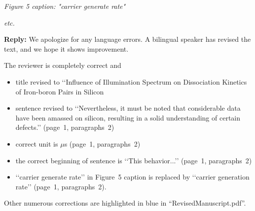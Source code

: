 \documentclass{WileyMSP-template}
\begin{document}
\emph{
Figure 5 caption: "carrier generate rate"}

\emph{
etc.}

\noindent
\textcolor[rgb]{0.51,0.00,0.00}{\textbf{Reply:}}
We apologize for any language errors.
A bilingual speaker has revised the text, and we hope it shows improvement.

The reviewer is completely correct and
\begin{itemize}
  \item title revised to ‘‘Influence of Illumination Spectrum on Dissociation Kinetics of Iron-boron Pairs in Silicon
  \item sentence revised to ‘‘Nevertheless, it must be noted that considerable data have been amassed on silicon, resulting in a solid understanding of certain defects.’’
  (page~1, paragraphs~2)
  \item correct unit is $\mu$s (page~1, paragraphs~2)
  \item the correct beginning of sentence is ‘‘This behavior...’’ (page~1, paragraphs~2)
  \item ‘‘carrier generate rate’’ in Figure~5 caption is replaced by ‘‘carrier generation rate’’ (page~1, paragraphs~2).
\end{itemize}

Other numerous corrections are highlighted in blue in ``RevisedManuscript.pdf''.

 
\end{document}
